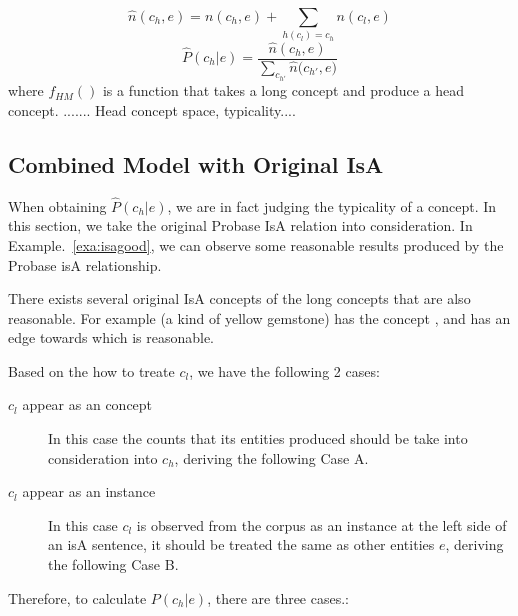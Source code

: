 $$\hat{n}(c_h, e)={n}(c_h, e)+\sum_{ h(c_l)=c_h} n(c_l,e)$$
$$\hat{P}(c_h|e)=\frac{\hat{n}(c_h, e)}{\sum_{c_{h'}}{\hat{n}(c_{h'}}, e)}$$
where $f_{HM}()$ is a function that takes a long concept and produce a head concept.
....... Head concept space, typicality....


\subsection{Combined Model with Original IsA}
When obtaining $\hat{P}(c_h|e)$, we are in fact judging the typicality of a concept.
In this section, we take the original Probase IsA relation into consideration. In Example.~\ref{exa:isagood}, we can observe some reasonable results produced by the Probase isA relationship.

\begin{example}
\label{exa:isagood}
  There exists several original IsA concepts of the long concepts that are also reasonable. For example (a kind of yellow gemstone) has the concept , and  has an edge towards  which is reasonable.
\end{example}

Based on the how to treate $c_l$, we have the following 2 cases:

\begin{description}
  \item[$c_l$ appear as an concept] In this case the counts that its entities produced should be take into consideration into $c_h$, deriving the following Case A.
  \item[$c_l$ appear as an instance] In this case $c_l$ is observed from the corpus as an instance at the left side of an isA sentence, it should be treated the same as other entities $e$, deriving the following Case B.
\end{description}


Therefore, to calculate  $P({c_h}|e)$, there are three cases.:

